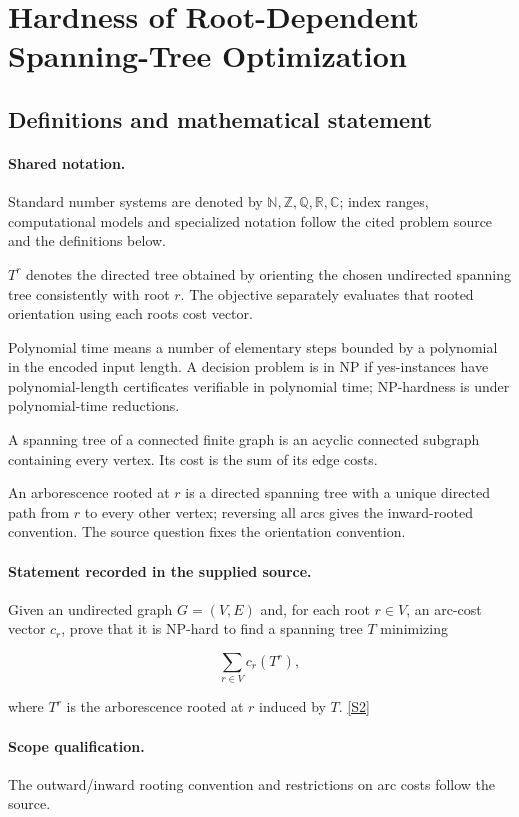 \documentclass[11pt]{article}
\newcommand{\sref}[2]{\hyperlink{source:#1:#2}{[S#2]}}
\begin{document}
\section{Hardness of Root-Dependent Spanning-Tree Optimization}\label{statement}

\subsection{Definitions and mathematical statement}

\paragraph{Shared notation.}Standard number systems are denoted by $\mathbb N,\mathbb Z,\mathbb Q,\mathbb R,\mathbb C$; index ranges, computational models and specialized notation follow the cited problem source and the definitions below.


$T^r$ denotes the directed tree obtained by orienting the chosen undirected spanning tree consistently with root $r$. The objective separately evaluates that rooted orientation using each root\textquotesingle s cost vector.

Polynomial time means a number of elementary steps bounded by a polynomial in the encoded input length. A decision problem is in $\mathrm{NP}$ if yes-instances have polynomial-length certificates verifiable in polynomial time; NP-hardness is under polynomial-time reductions.

A spanning tree of a connected finite graph is an acyclic connected subgraph containing every vertex. Its cost is the sum of its edge costs.

An arborescence rooted at $r$ is a directed spanning tree with a unique directed path from $r$ to every other vertex; reversing all arcs gives the inward-rooted convention. The source question fixes the orientation convention.
\paragraph{Statement recorded in the supplied source.}
Given an undirected graph $G=(V,E)$ and, for each root $r\in V$, an arc-cost vector $c_r$, prove that it is NP-hard to find a spanning tree $T$ minimizing

$$\sum_{r\in V}c_r(T^r),$$

where $T^r$ is the arborescence rooted at $r$ induced by $T$. \sref{statement}{2}
\paragraph{Scope qualification.}
The outward/inward rooting convention and restrictions on arc costs follow the source.
\end{document}
